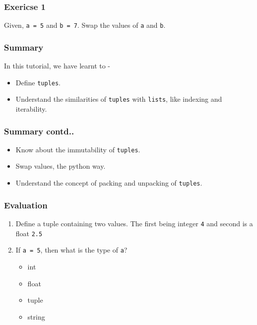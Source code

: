 \documentclass[17pt,compress]{beamer}
\newcounter{saveenumi}
\newcommand{\seti}{\setcounter{saveenumi}{\value{enumi}}}
\begin{document}
\begin{frame}
\frametitle{Exericse 1}
\label{sec-4}

  Given, \texttt{a = 5} and \texttt{b = 7}. Swap the values of \texttt{a} and \texttt{b}.
\end{frame}
\begin{frame}
\frametitle{Summary}
\label{sec-5.1}

  In this tutorial, we have learnt to -


\begin{itemize}
\item Define \texttt{tuples}.
\item Understand the similarities of \texttt{tuples} with \texttt{lists}, like indexing and 
    iterability.
\end{itemize}
\end{frame}
\begin{frame}
\frametitle{Summary contd..}
\label{sec-5.2}

\begin{itemize}
\item Know about the immutability of \texttt{tuples}.
\item Swap values, the python way.
\item Understand the concept of packing and unpacking of \texttt{tuples}.
\end{itemize}
\end{frame}
\begin{frame}
\frametitle{Evaluation}
\label{sec-6.1}

\begin{enumerate}
\item Define a tuple containing two values. The first being integer \texttt{4} and 
   second is a float \texttt{2.5} \pause
\vspace{8pt}
\item If \texttt{a = 5}, then what is the type of \texttt{a}?\pause
\begin{itemize}
\item int
\item float
\item tuple
\item string
\end{itemize}
\seti
\end{enumerate}
\end{frame}
\end{document}
